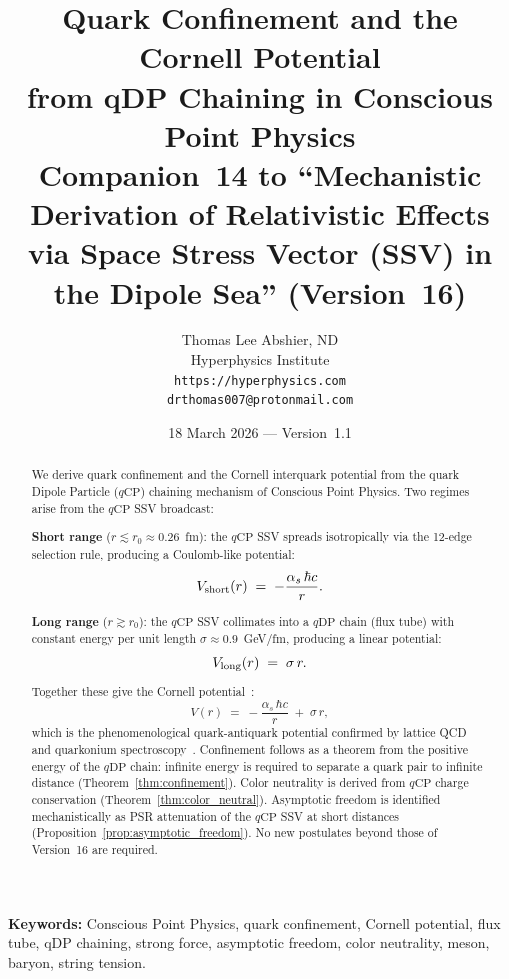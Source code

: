 \documentclass[12pt]{article}
\title{\textbf{Quark Confinement and the Cornell Potential\\
from qDP Chaining in Conscious Point Physics}\\[6pt]
{\large Companion~14 to ``Mechanistic Derivation of Relativistic Effects\\
via Space Stress Vector (SSV) in the Dipole Sea'' (Version~16)}}
\author{Thomas Lee Abshier, ND\\
Hyperphysics Institute\\
\texttt{https://hyperphysics.com}\\
\texttt{drthomas007@protonmail.com}}
\date{18 March 2026 --- Version~1.1}
\newcommand{\qCP}{q\mathrm{CP}}
\newcommand{\qDP}{q\mathrm{DP}}
\newcommand{\as}{\alpha_s}
\begin{document}
\maketitle

\noindent\textbf{Keywords:} Conscious Point Physics, quark confinement,
Cornell potential, flux tube, qDP chaining, strong force, asymptotic
freedom, color neutrality, meson, baryon, string tension.


\begin{abstract}
We derive quark confinement and the Cornell interquark potential from
the quark Dipole Particle ($\qCP$) chaining mechanism of Conscious
Point Physics. Two regimes arise from the $\qCP$ SSV broadcast:

\noindent\textbf{Short range} ($r \lesssim r_0 \approx 0.26$~fm):
the $\qCP$ SSV spreads isotropically via the 12-edge selection rule,
producing a Coulomb-like potential:
\begin{equation}
V_{\rm short}(r) \;=\; -\frac{\as\,\hbar c}{r}.
\label{eq:V_short_abstract}
\end{equation}

\noindent\textbf{Long range} ($r \gtrsim r_0$):
the $\qCP$ SSV collimates into a $\qDP$ chain (flux tube) with
constant energy per unit length $\sigma \approx 0.9$~GeV/fm,
producing a linear potential:
\begin{equation}
V_{\rm long}(r) \;=\; \sigma\,r.
\label{eq:V_long_abstract}
\end{equation}

Together these give the Cornell potential~\cite{cornell1978}:
\begin{equation}
V(r) \;=\; -\frac{\as\,\hbar c}{r} \;+\; \sigma\,r,
\label{eq:cornell_abstract}
\end{equation}
which is the phenomenological quark-antiquark potential confirmed by
lattice QCD and quarkonium spectroscopy~\cite{eichten1980}.
Confinement follows as a theorem from the positive energy of the
$\qDP$ chain: infinite energy is required to separate a quark pair
to infinite distance (Theorem~\ref{thm:confinement}). Color
neutrality is derived from $\qCP$ charge conservation
(Theorem~\ref{thm:color_neutral}). Asymptotic freedom is
identified mechanistically as PSR attenuation of the $\qCP$ SSV
at short distances (Proposition~\ref{prop:asymptotic_freedom}).
No new postulates beyond those of Version~16 are required.
\end{abstract}
\end{document}
